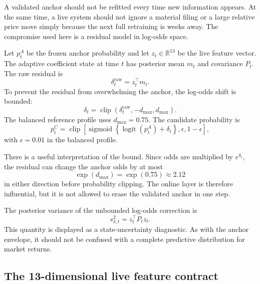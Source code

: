 \documentclass[11pt]{article}
\newcommand{\sigmoid}{\operatorname{sigmoid}}
\newcommand{\logit}{\operatorname{logit}}
\newcommand{\clip}{\operatorname{clip}}
\newcommand{\R}{\mathbb{R}}
\begin{document}
A validated anchor should not be refitted every time new information appears. At the same time, a live system should not ignore a material filing or a large relative price move simply because the next full retraining is weeks away. The compromise used here is a residual model in log-odds space.

Let $p_t^A$ be the frozen anchor probability and let $z_t\in\R^{13}$ be the live feature vector. The adaptive coefficient state at time $t$ has posterior mean $m_t$ and covariance $P_t$. The raw residual is
\begin{equation}
\delta_t^{\mathrm{raw}}=z_t^\top m_t.
\label{eq:rawdelta}
\end{equation}
To prevent the residual from overwhelming the anchor, the log-odds shift is bounded:
\begin{equation}
\delta_t=\clip\left(\delta_t^{\mathrm{raw}},-d_{\max},d_{\max}\right).
\label{eq:boundedshift}
\end{equation}
The balanced reference profile uses $d_{\max}=0.75$. The candidate probability is
\begin{equation}
p_t^C=
\clip\left[
\sigmoid\left\{\logit(p_t^A)+\delta_t\right\},
\epsilon,1-\epsilon
\right],
\label{eq:candidate}
\end{equation}
with $\epsilon=0.01$ in the balanced profile.

There is a useful interpretation of the bound. Since odds are multiplied by $e^{\delta_t}$, the residual can change the anchor odds by at most
\begin{equation}
\exp(d_{\max})=\exp(0.75)\approx2.12
\end{equation}
in either direction before probability clipping. The online layer is therefore influential, but it is not allowed to erase the validated anchor in one step.

The posterior variance of the unbounded log-odds correction is
\begin{equation}
s_{\delta,t}^2=z_t^\top P_tz_t.
\label{eq:deltavar}
\end{equation}
This quantity is displayed as a state-uncertainty diagnostic. As with the anchor envelope, it should not be confused with a complete predictive distribution for market returns.

\subsection{The 13-dimensional live feature contract}
\end{document}
